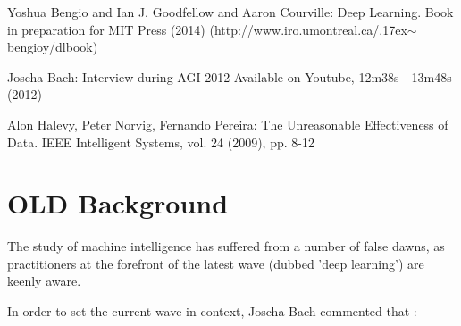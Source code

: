 \documentclass[citeauthoryear]{llncs}
\begin{document}
%
%
\begin{thebibliography}{}
%
\newcommand{\mytilde}{\raise.17ex\hbox{$\scriptstyle\mathtt{\sim}$}}

Yoshua Bengio and Ian J. Goodfellow and Aaron Courville:
Deep Learning.
Book in preparation for MIT Press (2014)
(http://www.iro.umontreal.ca/\mytilde{}bengioy/dlbook)

Joscha Bach:
Interview during AGI 2012
Available on Youtube, 12m38s - 13m48s (2012)

Alon Halevy, Peter Norvig, Fernando Pereira:
The Unreasonable Effectiveness of Data.
IEEE Intelligent Systems, vol. 24 (2009), pp. 8-12

%
%
%
%

\end{thebibliography}

\section{OLD Background}
The study of machine intelligence has suffered from a number of false dawns, 
as practitioners at the forefront of the latest wave (dubbed 'deep learning') 
are keenly aware.  
%

In order to set the current wave in context, Joscha Bach \cite{Joscha-Bach-2012-interview}
commented that :
\end{document}
